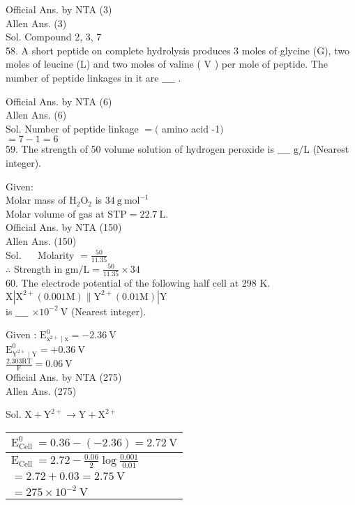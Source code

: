 \documentclass[10pt]{article}
\begin{document}
Official Ans. by NTA (3)\\
Allen Ans. (3)\\
Sol. Compound 2, 3, 7\\
58. A short peptide on complete hydrolysis produces 3 moles of glycine (G), two moles of leucine (L) and two moles of valine ( V ) per mole of peptide. The number of peptide linkages in it are \(\_\_\_\_\) .

Official Ans. by NTA (6)\\
Allen Ans. (6)\\
Sol. Number of peptide linkage \(=(\) amino acid -1\()\)\\
\(=7-1=6\)\\
59. The strength of 50 volume solution of hydrogen peroxide is \(\_\_\_\_\) \(\mathrm{g} / \mathrm{L}\) (Nearest integer).

Given:\\
Molar mass of \(\mathrm{H}_{2} \mathrm{O}_{2}\) is \(34 \mathrm{~g} \mathrm{~mol}^{-1}\)\\
Molar volume of gas at \(\mathrm{STP}=22.7 \mathrm{~L}\).\\
Official Ans. by NTA (150)\\
Allen Ans. (150)\\
Sol. \(\quad\) Molarity \(=\frac{50}{11.35}\)\\
\(\therefore\) Strength in \(\mathrm{gm} / \mathrm{L}=\frac{50}{11.35} \times 34\)\\
60. The electrode potential of the following half cell at 298 K.\\
\(\mathrm{X}\left|\mathrm{X}^{2+}(0.001 \mathrm{M}) \| \mathrm{Y}^{2+}(0.01 \mathrm{M})\right| \mathrm{Y}\)\\
is \(\_\_\_\_\) \(\times 10^{-2} \mathrm{~V}\) (Nearest integer).

Given : \(\mathrm{E}_{\mathrm{x}^{2+} \mid \mathrm{x}}^{0}=-2.36 \mathrm{~V}\)\\
\(\mathrm{E}_{\mathrm{Y}^{2+} \mid \mathrm{Y}}^{0}=+0.36 \mathrm{~V}\)\\
\(\frac{2.303 \mathrm{RT}}{\mathrm{F}}=0.06 \mathrm{~V}\)\\
Official Ans. by NTA (275)\\
Allen Ans. (275)

Sol. \(\mathrm{X}+\mathrm{Y}^{2+} \rightarrow \mathrm{Y}+\mathrm{X}^{2+}\)

\begin{center}
\begin{tabular}{|l|}
\hline
\(\mathrm{E}_{\text {Cell }}^{0}=0.36-(-2.36)=2.72 \mathrm{~V}\) \\
\hline
\(\mathrm{E}_{\text {Cell }}=2.72-\frac{0.06}{2} \log \frac{0.001}{0.01}\) \\
\hline
\(=2.72+0.03=2.75 \mathrm{~V}\) \\
\hline
\(=275 \times 10^{-2} \mathrm{~V}\) \\
\hline
\end{tabular}
\end{center}
\end{document}
